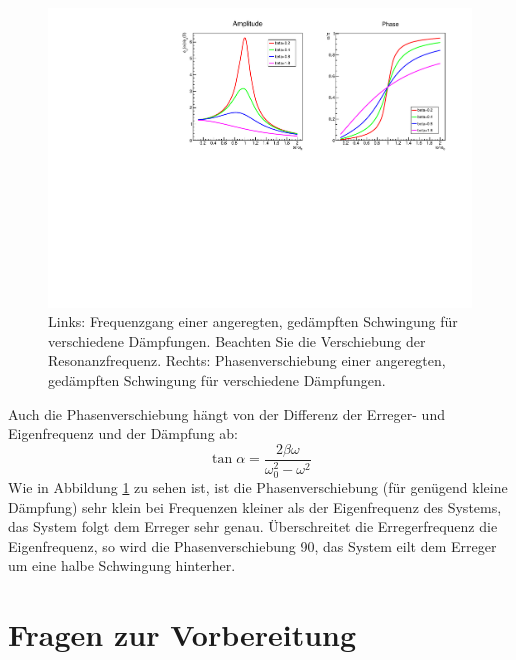 \begin{figure}[ht!]
	\centering
	\includegraphics[width=\textwidth]{Abbildungen/ampl_phase.pdf}
	\caption{Links: Frequenzgang einer angeregten, gedämpften Schwingung für verschiedene Dämpfungen. Beachten Sie die Verschiebung der Resonanzfrequenz. Rechts: Phasenverschiebung einer angeregten, gedämpften Schwingung für verschiedene Dämpfungen.}
	\label{fig:Resonanz}
\end{figure}

Auch die Phasenverschiebung hängt von der Differenz der Erreger- und Eigenfrequenz und der Dämpfung ab:
\begin{equation*}
	\tan\alpha = \frac{2\beta\omega}{\omega_0^2-\omega^2}
\end{equation*}
Wie in Abbildung \ref{fig:Resonanz} zu sehen ist, ist die Phasenverschiebung (für genügend kleine Dämpfung) sehr klein bei Frequenzen kleiner als der Eigenfrequenz des Systems, das System folgt dem Erreger sehr genau. Überschreitet die Erregerfrequenz die Eigenfrequenz, so wird die Phasenverschiebung 90\degree, das System eilt dem Erreger um eine halbe Schwingung hinterher.
\section{Fragen zur Vorbereitung}

